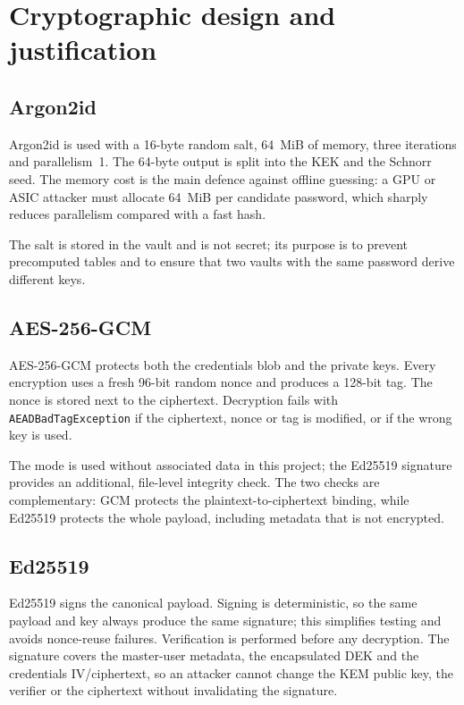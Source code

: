\documentclass[11pt,a4paper]{article}
\newcommand{\code}[1]{\texttt{#1}}
\begin{document}
\section{Cryptographic design and justification}\label{sec:crypto}

\subsection{Argon2id}

Argon2id is used with a 16-byte random salt, 64~MiB of memory, three iterations
and parallelism~1. The 64-byte output is split into the KEK and the Schnorr
seed. The memory cost is the main defence against offline guessing: a GPU or
ASIC attacker must allocate 64~MiB per candidate password, which sharply reduces
parallelism compared with a fast hash.

The salt is stored in the vault and is not secret; its purpose is to prevent
precomputed tables and to ensure that two vaults with the same password derive
different keys.

\subsection{AES-256-GCM}

AES-256-GCM protects both the credentials blob and the private keys. Every
encryption uses a fresh 96-bit random nonce and produces a 128-bit tag. The
nonce is stored next to the ciphertext. Decryption fails with
\code{AEADBadTagException} if the ciphertext, nonce or tag is modified, or if the
wrong key is used.

The mode is used without associated data in this project; the Ed25519 signature
provides an additional, file-level integrity check. The two checks are
complementary: GCM protects the plaintext-to-ciphertext binding, while Ed25519
protects the whole payload, including metadata that is not encrypted.

\subsection{Ed25519}

Ed25519 signs the canonical payload. Signing is deterministic, so the same
payload and key always produce the same signature; this simplifies testing and
avoids nonce-reuse failures. Verification is performed before any decryption.
The signature covers the master-user metadata, the encapsulated DEK and the
credentials IV/ciphertext, so an attacker cannot change the KEM public key, the
verifier or the ciphertext without invalidating the signature.
\end{document}

